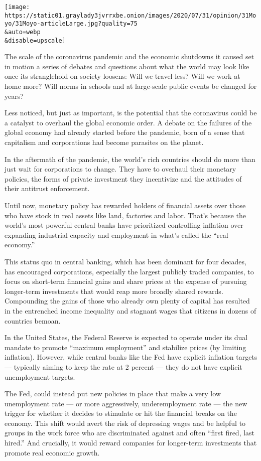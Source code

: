 \texttt{[image: https://static01.graylady3jvrrxbe.onion/images/2020/07/31/opinion/31Moyo/31Moyo-articleLarge.jpg?quality=75\\\&auto=webp\\\&disable=upscale]}

The scale of the coronavirus pandemic and the economic shutdowns it
caused set in motion a series of debates and questions about what the
world may look like once its stranglehold on society loosens: Will we
travel less? Will we work at home more? Will norms in schools and at
large-scale public events be changed for years?

Less noticed, but just as important, is the potential that the
coronavirus could be a catalyst to overhaul the global economic order. A
debate on the failures of the global economy had already started before
the pandemic, born of a sense that capitalism and corporations had
become parasites on the planet.

In the aftermath of the pandemic, the world's rich countries should do
more than just wait for corporations to change. They have to overhaul
their monetary policies, the forms of private investment they
incentivize and the attitudes of their antitrust enforcement.

Until now, monetary policy has rewarded holders of financial assets over
those who have stock in real assets like land, factories and labor.
That's because the world's most powerful central banks have prioritized
controlling inflation over expanding industrial capacity and employment
in what's called the ``real economy.''

This status quo in central banking, which has been dominant for four
decades, has encouraged corporations, especially the largest publicly
traded companies, to focus on short-term financial gains and share
prices at the expense of pursuing longer-term investments that would
reap more broadly shared rewards. Compounding the gains of those who
already own plenty of capital has resulted in the entrenched income
inequality and stagnant wages that citizens in dozens of countries
bemoan.

In the United States, the Federal Reserve is expected to operate under
its dual mandate to promote ``maximum employment'' and stabilize prices
(by limiting inflation). However, while central banks like the Fed have
explicit inflation targets --- typically aiming to keep the rate at 2
percent --- they do not have explicit unemployment targets.

The Fed, could instead put new policies in place that make a very low
unemployment rate --- or more aggressively, underemployment rate --- the
new trigger for whether it decides to stimulate or hit the financial
breaks on the economy. This shift would avert the risk of depressing
wages and be helpful to groups in the work force who are discriminated
against and often ``first fired, last hired.'' And crucially, it would
reward companies for longer-term investments that promote real economic
growth.

